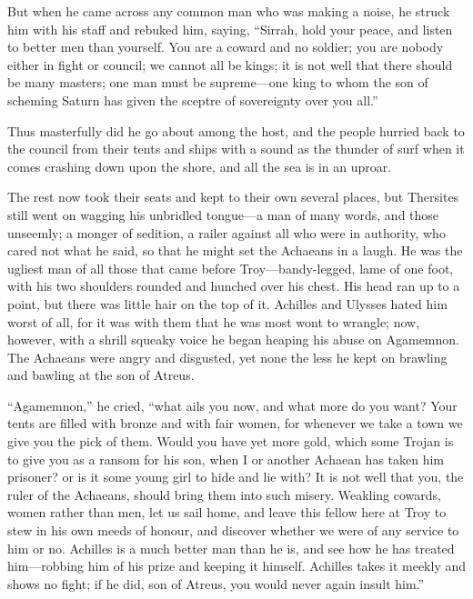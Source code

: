 But when he came across any common man who was making a noise, he struck
him with his staff and rebuked him, saying, “Sirrah, hold your peace, and
listen to better men than yourself. You are a coward and no soldier; you
are nobody either in fight or council; we cannot all be kings; it is not
well that there should be many masters; one man must be supreme—one
king to whom the son of scheming Saturn has given the sceptre of
sovereignty over you all.”

Thus masterfully did he go about among the host, and the people hurried
back to the council from their tents and ships with a sound as the thunder
of surf when it comes crashing down upon the shore, and all the sea is in
an uproar.

The rest now took their seats and kept to their own several places, but
Thersites still went on wagging his unbridled tongue—a man of many
words, and those unseemly; a monger of sedition, a railer against all who
were in authority, who cared not what he said, so that he might set the
Achaeans in a laugh. He was the ugliest man of all those that came before
Troy—bandy-legged, lame of one foot, with his two shoulders rounded
and hunched over his chest. His head ran up to a point, but there was
little hair on the top of it. Achilles and Ulysses hated him worst of all,
for it was with them that he was most wont to wrangle; now, however, with
a shrill squeaky voice he began heaping his abuse on Agamemnon. The
Achaeans were angry and disgusted, yet none the less he kept on brawling
and bawling at the son of Atreus.

“Agamemnon,” he cried, “what ails you now, and what more do you want? Your
tents are filled with bronze and with fair women, for whenever we take a
town we give you the pick of them. Would you have yet more gold, which
some Trojan is to give you as a ransom for his son, when I or another
Achaean has taken him prisoner? or is it some young girl to hide and lie
with? It is not well that you, the ruler of the Achaeans, should bring
them into such misery. Weakling cowards, women rather than men, let us
sail home, and leave this fellow here at Troy to stew in his own meeds of
honour, and discover whether we were of any service to him or no. Achilles
is a much better man than he is, and see how he has treated him—robbing
him of his prize and keeping it himself. Achilles takes it meekly and
shows no fight; if he did, son of Atreus, you would never again insult
him.”

